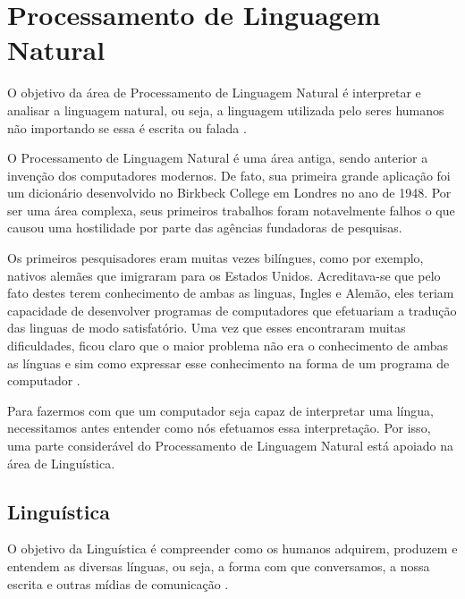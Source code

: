 \chapter{Processamento de Linguagem Natural}
\label{cap:Processamento}


O objetivo da área de Processamento de Linguagem Natural é interpretar e
analisar a linguagem natural, ou seja, a linguagem utilizada pelo seres humanos não
importando se essa é escrita ou falada \cite{manningschutze1999}.

O Processamento de Linguagem Natural é uma área antiga, sendo anterior a
invenção dos computadores modernos. De fato, sua primeira grande aplicação foi
um dicionário desenvolvido no Birkbeck College em Londres no ano de 1948. Por ser
uma área complexa, seus primeiros trabalhos foram notavelmente falhos o que
causou uma hostilidade por parte das agências fundadoras de pesquisas.

Os primeiros pesquisadores eram muitas vezes bilíngues, como por exemplo,
nativos alemães que imigraram para os Estados Unidos. Acreditava-se que pelo
fato destes terem conhecimento de ambas as linguas, Ingles e Alemão, eles teriam
capacidade de desenvolver programas de computadores que efetuariam a tradução das linguas
de modo satisfatório. Uma vez que esses encontraram muitas dificuldades,
ficou claro que o maior problema não era o conhecimento de ambas as
línguas e sim como expressar esse conhecimento na forma de um programa de
computador \cite{history}.

Para fazermos com que um computador seja capaz de interpretar uma
língua, necessitamos antes entender como nós efetuamos essa
interpretação.
Por isso, uma parte considerável do Processamento de Linguagem Natural está apoiado na área de Linguística.

\section{Linguística}

O objetivo da Linguística é compreender como os humanos adquirem, produzem e
entendem as diversas línguas, ou seja, a forma com que conversamos, a nossa
escrita e outras mídias de comunicação \cite{manningschutze1999}.

